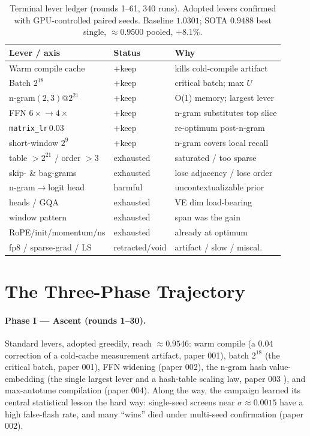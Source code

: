 \documentclass{article}
\begin{document}
\begin{table}[t]
\caption{Terminal lever ledger (rounds 1--61, 340 runs). Adopted levers confirmed with GPU-controlled paired seeds. Baseline $1.0301$; SOTA $0.9488$ best single, $\approx0.9500$ pooled, $+8.1\%$.}
\label{tab:levers}
\vskip 0.1in
\begin{center}
\begin{scriptsize}
\setlength{\tabcolsep}{3pt}
\begin{tabular}{lll}
\toprule
Lever / axis & Status & Why \\
\midrule
Warm compile cache & +keep & kills cold-compile artifact \\
Batch $2^{18}$ & +keep & critical batch; max $U$ \\
n-gram$(2,3)$@$2^{21}$ & +keep & O(1) memory; largest lever \\
FFN $6\times\!\to\!4\times$ & +keep & n-gram substitutes top slice \\
\texttt{matrix\_lr}\,$0.03$ & +keep & re-optimum post-n-gram \\
short-window $2^{9}$ & +keep & n-gram covers local recall \\
\midrule
table $>2^{21}$ / order $>3$ & exhausted & saturated / too sparse \\
skip- \& bag-grams & exhausted & lose adjacency / lose order \\
n-gram$\to$logit head & harmful & uncontextualizable prior \\
heads / GQA & exhausted & VE dim load-bearing \\
window pattern & exhausted & span was the gain \\
RoPE/init/momentum/ns & exhausted & already at optimum \\
fp8 / sparse-grad / LS & retracted/void & artifact / slow / miscal.\ \\
\bottomrule
\end{tabular}
\end{scriptsize}
\end{center}
\vskip -0.15in
\end{table}

\section{The Three-Phase Trajectory}
\label{sec:trajectory}

\paragraph{Phase I --- Ascent (rounds 1--30).} Standard levers, adopted greedily, reach $\approx0.9546$: warm compile (a $0.04$ correction of a cold-cache measurement artifact, paper 001), batch $2^{18}$ (the critical batch, paper 001), FFN widening (paper 002), the n-gram hash value-embedding (the single largest lever and a hash-table scaling law, paper 003 \cite{ophis2026ngram}), and max-autotune compilation (paper 004). Along the way, the campaign learned its central statistical lesson the hard way: single-seed screens near $\sigma\approx0.0015$ have a high false-flash rate, and many ``wins'' died under multi-seed confirmation (paper 002).
\end{document}
